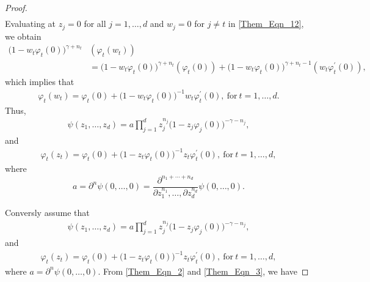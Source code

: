 \documentclass[10pt,a4paper]{amsart}
\begin{document}
\begin{proof}
\begin{align}
  	  \end{align}
  	  Evaluating at $z_j=0$ for all $j=1, \dots, d$ and $w_j=0$ for $j\neq t$ in \eqref{Them_Eqn_12}, we obtain 
  	  \begin{align}\label{Them_Eqn_13}
  	  	\big(1-w_t\varphi_t(0)\big)^{\gamma+n_t}&(\varphi_t(w_t))\nonumber\\
  	  	&=	\big(1-w_t\varphi_t(0)\big)^{\gamma+n_t}(\varphi_t(0))+\big(1-w_t\varphi_t(0)\big)^{\gamma+n_t-1}(w_t\varphi_t^{\prime}(0)),
  	  \end{align} 
  	  which implies that 
  	  \begin{gather*}
  	  \varphi_t(w_t)=\varphi_t(0)+\big(1-w_t\varphi_t(0)\big)^{-1}w_t\varphi_t^{\prime}(0),~ \mbox{for}~ t=1, \dots, d.
  	  \end{gather*}
  	  Thus,
  	  \begin{gather*}
  	  \psi(z_1, \dots, z_d)=a\prod_{j=1}^dz_j^{n_j}\big(1-z_j\varphi_j(0)\big)^{-\gamma-n_j},
  	  \end{gather*}
  	  and 
  	  \begin{gather*}
  	  \varphi_t(z_t)=\varphi_t(0)+\big(1-z_t\varphi_t(0)\big)^{-1}z_t\varphi_t^{\prime}(0),~ \mbox{for}~ t=1, \dots, d,
  	  \end{gather*}
  	  where $$a=\partial^n\psi(0, \dots, 0)=\frac{\partial^{n_1+\cdots+n_d}}{\partial z_1^{n_1},\dots, \partial z_d^{n_d}}\psi(0, \dots, 0).$$
  	  
  	  Conversly assume that 
  	  \begin{gather*}
  	  \psi(z_1, \dots, z_d)=a\prod_{j=1}^dz_j^{n_j}\big(1-z_j\varphi_j(0)\big)^{-\gamma-n_j},
  	  \end{gather*}
  	  and 
  	  \begin{gather*}
  	  \varphi_t(z_t)=\varphi_t(0)+\big(1-z_t\varphi_t(0)\big)^{-1}z_t\varphi_t^{\prime}(0),~ \mbox{for}~ t=1, \dots, d,
  	  \end{gather*}
  	  where $a=\partial^n\psi(0, \dots, 0)$.
  	  From \eqref{Them_Eqn_2} and \eqref{Them_Eqn_3}, we have  
  	  

\end{proof}
\end{document}
